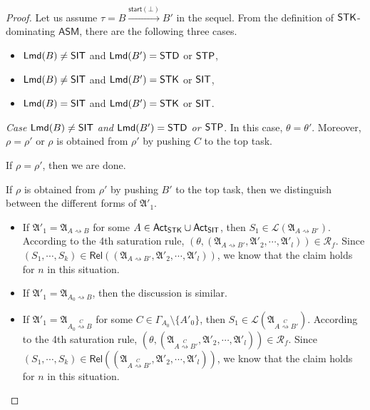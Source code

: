 \documentclass[preprint,12pt]{elsarticle}
\newcommand\act{{\sf Act}}
\newcommand\lmd{{\sf Lmd}}
\newcommand\standard{{\sf STD}}
\newcommand\singletop{{\sf STP}}
\newcommand\singletask{{\sf STK}}
\newcommand\singleinstance{{\sf SIT}}
\newcommand{\AMASS}{\textsf{ASM}}
\newcommand\startactivity{{\mathsf{start} }}
\newcommand\AutReach{\mathscr{R}}
\newcommand\Rel{\mathsf{Rel}}
\newcommand\Aut{{\mathfrak{A} }}
\newcommand\Lang{{\mathscr{L} }}
\begin{document}
\begin{proof}
Let us assume $\tau = B \xrightarrow{\startactivity(\bot)} B'$ in the sequel. From the definition of $\singletask$-dominating $\AMASS$, there are the following three cases. 
\begin{itemize}
\item $\lmd(B) \neq \singleinstance$ and $\lmd(B') = \standard$ or $\singletop$, 
%
\item $\lmd(B) \neq \singleinstance$ and $\lmd(B') = \singletask$ or $\singleinstance$, 
%
\item $\lmd(B) = \singleinstance$ and $\lmd(B') = \singletask$ or $\singleinstance$. 
\end{itemize}

\smallskip

\noindent \emph{Case $\lmd(B) \neq \singleinstance$ and $\lmd(B') = \standard$ or $\singletop$}. In this case, $\theta = \theta'$. Moreover, $\rho = \rho'$ or $\rho$ is obtained from $\rho'$ by pushing $C$ to the top task.

If $\rho = \rho'$, then we are done. 

If $\rho$ is obtained from $\rho'$ by pushing $B'$ to the top task, then we distinguish between the different forms of $\Aut'_1$. 
\begin{itemize}
\item If $\Aut'_1 = \Aut_{A \rightsquigarrow B}$ for some $A \in \act_\singletask \cup \act_\singleinstance$, then 
 $S_1 \in  \Lang(\Aut_{A \rightsquigarrow B'})$. According to the 4th saturation rule, $(\theta, (\Aut_{A \rightsquigarrow B'}, \Aut'_2, \cdots, \Aut'_l)) \in \AutReach_f$. Since $(S_1, \cdots, S_k) \in \Rel((\Aut_{A \rightsquigarrow B'}, \Aut'_2, \cdots, \Aut'_l))$, we know that the claim holds for $n$ in this situation.

%
\item If $\Aut'_1 = \Aut_{A_0 \rightsquigarrow B}$, then the discussion is similar. 
%
\item If $\Aut'_1 = \Aut_{A_0 \stackrel{C}{\rightsquigarrow} B}$ for some $C \in \Gamma_{A_0} \setminus \{A'_0\}$, then $S_1 \in  \Lang(\Aut_{A \stackrel{C}{\rightsquigarrow} B'})$.  According to the 4th saturation rule, $(\theta, (\Aut_{A \stackrel{C}{\rightsquigarrow} B'}, \Aut'_2, \cdots, \Aut'_l)) \in \AutReach_f$. Since $(S_1, \cdots, S_k) \in \Rel((\Aut_{A \stackrel{C}{\rightsquigarrow} B'}, \Aut'_2, \cdots, \Aut'_l))$, we know that the claim holds for $n$ in this situation.
\end{itemize}

\smallskip


\end{proof}
\end{document}
